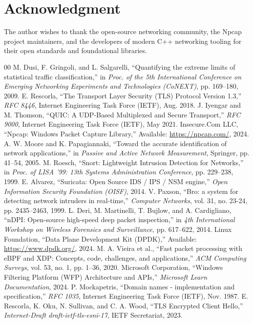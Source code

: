 \documentclass[conference]{IEEEtran}
\begin{document}
\section*{Acknowledgment}
The author wishes to thank the open-source networking community, the Npcap project maintainers, and the developers of modern C++ networking tooling for their open standards and foundational libraries.

\begin{thebibliography}{00}
 M. Dusi, F. Gringoli, and L. Salgarelli, ``Quantifying the extreme limits of statistical traffic classification,'' in \textit{Proc. of the 5th International Conference on Emerging Networking Experiments and Technologies (CoNEXT)}, pp. 169--180, 2009.
 E. Rescorla, ``The Transport Layer Security (TLS) Protocol Version 1.3,'' \textit{RFC 8446}, Internet Engineering Task Force (IETF), Aug. 2018.
 J. Iyengar and M. Thomson, ``QUIC: A UDP-Based Multiplexed and Secure Transport,'' \textit{RFC 9000}, Internet Engineering Task Force (IETF), May 2021.
 Insecure.Com LLC, ``Npcap: Windows Packet Capture Library,'' Available: \url{https://npcap.com/}, 2024.
 A. W. Moore and K. Papagiannaki, ``Toward the accurate identification of network applications,'' in \textit{Passive and Active Network Measurement}, Springer, pp. 41--54, 2005.
 M. Roesch, ``Snort: Lightweight Intrusion Detection for Networks,'' in \textit{Proc. of LISA '99: 13th Systems Administration Conference}, pp. 229--238, 1999.
 E. Alvarez, ``Suricata: Open Source IDS / IPS / NSM engine,'' \textit{Open Information Security Foundation (OISF)}, 2014.
 V. Paxson, ``Bro: a system for detecting network intruders in real-time,'' \textit{Computer Networks}, vol. 31, no. 23-24, pp. 2435--2463, 1999.
 L. Deri, M. Martinelli, T. Bujlow, and A. Cardigliano, ``nDPI: Open-source high-speed deep packet inspection,'' in \textit{4th International Workshop on Wireless Forensics and Surveillance}, pp. 617--622, 2014.
 Linux Foundation, ``Data Plane Development Kit (DPDK),'' Available: \url{https://www.dpdk.org/}, 2024.
 M. A. Vieira et al., ``Fast packet processing with eBPF and XDP: Concepts, code, challenges, and applications,'' \textit{ACM Computing Surveys}, vol. 53, no. 1, pp. 1--36, 2020.
 Microsoft Corporation, ``Windows Filtering Platform (WFP) Architecture and APIs,'' \textit{Microsoft Learn Documentation}, 2024.
 P. Mockapetris, ``Domain names - implementation and specification,'' \textit{RFC 1035}, Internet Engineering Task Force (IETF), Nov. 1987.
 E. Rescorla, K. Oku, N. Sullivan, and C. A. Wood, ``TLS Encrypted Client Hello,'' \textit{Internet-Draft draft-ietf-tls-esni-17}, IETF Secretariat, 2023.
\end{thebibliography}
\end{document}
